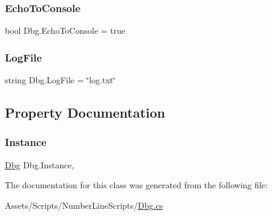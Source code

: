 \mbox{\label{classDbg_a320be8a5d39f4ceb8b8a36d06a671113}} 
\subsubsection{\texorpdfstring{Echo\+To\+Console}{EchoToConsole}}
{\footnotesize\ttfamily bool Dbg.\+Echo\+To\+Console = true}

\mbox{\label{classDbg_a1882a17eb1d1e854e51ae7102ffe798c}} 
\subsubsection{\texorpdfstring{Log\+File}{LogFile}}
{\footnotesize\ttfamily string Dbg.\+Log\+File = \char`\"{}log.\+txt\char`\"{}}



\subsection{Property Documentation}
\mbox{\label{classDbg_a2e3e8eb911bd79c9185e8bcec17f365f}} 
\subsubsection{\texorpdfstring{Instance}{Instance}}
{\footnotesize\ttfamily \hyperlink{classDbg}{Dbg} Dbg.\+Instance\hspace{0.3cm}{\ttfamily [static]}, {\ttfamily [get]}}



The documentation for this class was generated from the following file\+:\begin{DoxyCompactItemize}
\item 
Assets/\+Scripts/\+Number\+Line\+Scripts/\hyperlink{Dbg_8cs}{Dbg.\+cs}\end{DoxyCompactItemize}
